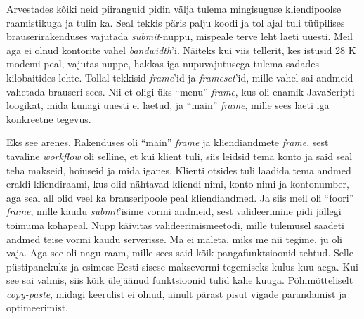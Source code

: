 Arvestades kõiki neid piiranguid pidin välja tulema mingisuguse kliendipoolse 
raamistikuga ja tulin ka. Seal tekkis päris palju koodi ja tol 
ajal tuli tüüpilises brauserirakenduses vajutada \emph{submit}-nuppu, mispeale 
terve leht laeti uuesti. Meil aga ei olnud kontorite vahel \emph{bandwidth}'i. Näiteks kui viis tellerit, kes istusid 28 K 
modemi peal, vajutas nuppe, hakkas iga nupuvajutusega 
tulema sadades kilobaitides lehte. Tollal tekkisid 
\emph{frame}'id ja \emph{frameset}'id, mille vahel sai andmeid 
vahetada brauseri sees. Nii et oligi üks \enquote{menu} \emph{frame}, kus oli 
enamik JavaScripti loogikat, mida kunagi uuesti ei laetud, ja 
\enquote{main} \emph{frame}, mille sees laeti iga konkreetne tegevus.


Eks see arenes. Rakenduses oli \enquote{main} \emph{frame} ja 
kliendiandmete \emph{frame}, sest tavaline \emph{workflow} oli selline, et kui 
klient tuli, siis leidsid tema konto ja said seal teha makseid, 
hoiuseid ja mida iganes. Klienti otsides tuli laadida 
tema andmed eraldi kliendiraami, kus olid nähtavad kliendi nimi, konto nimi ja 
kontonumber, aga seal all olid veel ka brauseripoole peal kliendiandmed. Ja siis 
meil oli \enquote{foori} \emph{frame}, mille kaudu \emph{submit}'isime vormi 
andmeid, sest valideerimine pidi jällegi toimuma kohapeal. Nupp käivitas 
valideerimismeetodi, mille tulemusel saadeti andmed teise vormi 
kaudu serverisse. Ma ei mäleta, miks me nii tegime, ju oli vaja. Aga see 
oli nagu raam, mille sees said kõik pangafunktsioonid tehtud. Selle püstipanekuks ja esimese 
Eesti-sisese maksevormi tegemiseks kulus kuu aega. Kui see sai valmis, siis kõik 
ülejäänud funktsioonid tulid kahe kuuga. Põhimõtteliselt 
\emph{copy-paste}, midagi keerulist ei olnud, ainult pärast pisut vigade 
parandamist ja optimeerimist.


